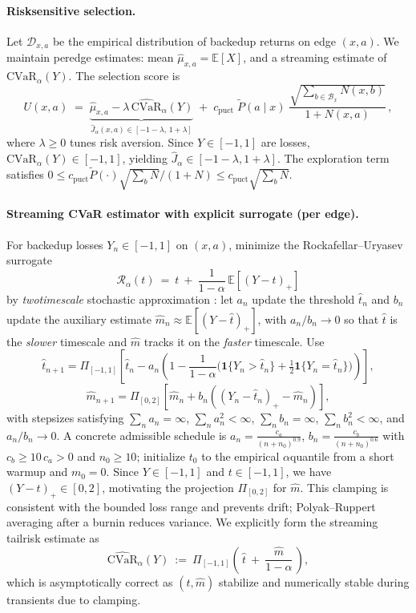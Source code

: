 \documentclass[10pt]{article}
\newcommand{\E}{\mathbb{E}}
\newcommand{\CVaR}{\mathrm{CVaR}}
\newcommand{\1}{\mathbf{1}}
\theoremstyle{plain}
\begin{document}
\paragraph{Risk\textendash sensitive selection.}
Let $\mathcal{D}_{x,a}$ be the empirical distribution of backed\textendash up returns on edge $(x,a)$. We maintain per\textendash edge estimates: mean $\hat\mu_{x,a}=\E[X]$, and a streaming estimate of $\CVaR_\alpha(Y)$. The selection score is
\begin{equation}
\label{eq:puct_cvar}
U(x,a)\;=\;\underbrace{\hat\mu_{x,a}-\lambda\,\widehat{\CVaR}_\alpha(Y)}_{\widehat{J}_\alpha(x,a)\in[-1-\lambda,\,1+\lambda]}\;+\;c_{\text{puct}}\;\tilde P(a\mid x)\;\frac{\sqrt{\sum_{b\in\mathcal{B}_x} N(x,b)}}{1+N(x,a)}\,,
\end{equation}
where $\lambda\!\ge\!0$ tunes risk aversion. Since $Y\in[-1,1]$ are losses, $\CVaR_\alpha(Y)\in[-1,1]$, yielding $\widehat{J}_\alpha\in[-1-\lambda,1+\lambda]$. The exploration term satisfies $0\le c_{\text{puct}}\tilde P(\cdot)\sqrt{\sum_b N}/(1+N)\le c_{\text{puct}}\sqrt{\sum_b N}$.

\paragraph{Streaming CVaR estimator with explicit surrogate (per edge).}
For backed\textendash up losses $Y_n\in[-1,1]$ on $(x,a)$, minimize the Rockafellar--Uryasev surrogate \citep{rockafellar2000cvar}
\[
\mathcal{R}_\alpha(t)\ =\ t\ +\ \frac{1}{1-\alpha}\,\E[(Y-t)_+]
\]
by \emph{two\textendash time\textendash scale} stochastic approximation \citep[Ch.~6]{borkar2008sa}: let $a_n$ update the threshold $\widehat t_n$ and $b_n$ update the auxiliary estimate $\widehat m_n\approx \E[(Y-\widehat t)_+]$, with $a_n/b_n\to 0$ so that $\widehat t$ is the \emph{slower} timescale and $\widehat m$ tracks it on the \emph{faster} timescale. Use
\[
\widehat t_{n+1}=\Pi_{[-1,1]}\!\left[\widehat t_n-a_n\!\left(1-\frac{1}{1-\alpha}\big(\1\{Y_n>\widehat t_n\}+\tfrac{1}{2}\1\{Y_n=\widehat t_n\}\big)\right)\right],
\]
\[
\widehat m_{n+1}=\Pi_{[0,2]}\!\left[\widehat m_n+b_n\!\left((Y_n-\widehat t_n)_+ - \widehat m_n\right)\right],
\]
with stepsizes satisfying $\sum_n a_n=\infty$, $\sum_n a_n^2<\infty$, $\sum_n b_n=\infty$, $\sum_n b_n^2<\infty$, and $a_n/b_n\to 0$. A concrete admissible schedule is $a_n=\frac{c_a}{(n+n_0)^{0.9}}$, $b_n=\frac{c_b}{(n+n_0)^{0.6}}$ with $c_b\ge 10\,c_a>0$ and $n_0\ge 10$; initialize $t_0$ to the empirical $\alpha$\textendash quantile from a short warm\textendash up and $m_0=0$. Since $Y\in[-1,1]$ and $t\in[-1,1]$, we have $(Y-t)_+\in[0,2]$, motivating the projection $\Pi_{[0,2]}$ for $\widehat m$. This clamping is consistent with the bounded loss range and prevents drift; Polyak--Ruppert averaging \citep{polyak1992pr} after a burn\textendash in reduces variance. We explicitly form the streaming tail\textendash risk estimate as
\begin{equation}
\label{eq:cvar_estimator}
\widehat{\CVaR}_\alpha(Y)\ :=\ \Pi_{[-1,1]}\!\left(\,\widehat t\ +\ \frac{\widehat m}{1-\alpha}\,\right),
\end{equation}
which is asymptotically correct as $(\widehat t,\widehat m)$ stabilize and numerically stable during transients due to clamping.
\end{document}
